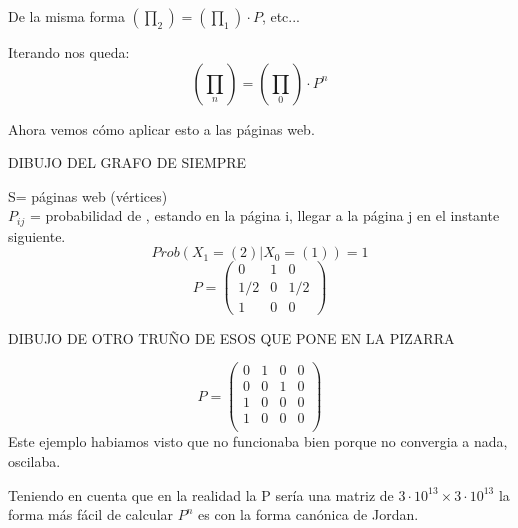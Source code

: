 De la misma forma $(\prod_2) = (\prod_1) \cdot P$, etc...

Iterando nos queda:
$$(\prod_n) = (\prod_0) \cdot P^n$$

Ahora vemos cómo aplicar esto a las páginas web.
\begin{example}
	DIBUJO DEL GRAFO DE SIEMPRE
	
	S= páginas web (vértices)\\
	$P_{ij}$ = probabilidad de , estando en la página i, llegar a la página j en el instante siguiente.
	$$Prob(X_1 = (2)| X_0 = (1)) = 1$$
	$$P =\left(\begin{matrix}
	0 & 1 & 0\\
	1/2 & 0 & 1/2\\
	1 & 0 & 0
	\end{matrix}\right)$$
\end{example}



\begin{example}[Otro]
	DIBUJO DE OTRO TRUÑO DE ESOS QUE PONE EN LA PIZARRA
	
	$$P = \left( \begin{matrix}
	0 & 1 & 0 & 0\\
	0 & 0 & 1 & 0\\
	1 & 0 & 0 & 0\\
	1 & 0 & 0 & 0\\
	\end{matrix}\right)$$
	Este ejemplo habiamos visto que no funcionaba bien porque no convergia a nada, oscilaba.
\end{example}



Teniendo en cuenta que en la realidad la P sería una matriz de $3\cdot 10^{13} \times 3\cdot 10^{13}$ la forma más fácil de calcular $P^n$ es con la forma canónica de Jordan.

